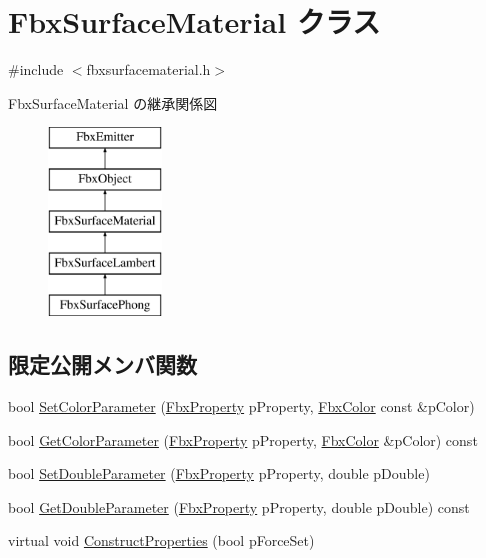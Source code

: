 \hypertarget{class_fbx_surface_material}{}\section{Fbx\+Surface\+Material クラス}
\label{class_fbx_surface_material}


{\ttfamily \#include $<$fbxsurfacematerial.\+h$>$}

Fbx\+Surface\+Material の継承関係図\begin{figure}[H]
\begin{center}
\leavevmode
\includegraphics[height=5.000000cm]{class_fbx_surface_material}
\end{center}
\end{figure}
\subsection*{限定公開メンバ関数}
\begin{DoxyCompactItemize}
\item 
bool \hyperlink{class_fbx_surface_material_aecd7c87e5db1902bf2b03834b92d5635}{Set\+Color\+Parameter} (\hyperlink{class_fbx_property}{Fbx\+Property} p\+Property, \hyperlink{class_fbx_color}{Fbx\+Color} const \&p\+Color)
\item 
bool \hyperlink{class_fbx_surface_material_a9c9823b3b0c6d2b6c216c4ca0a12a64d}{Get\+Color\+Parameter} (\hyperlink{class_fbx_property}{Fbx\+Property} p\+Property, \hyperlink{class_fbx_color}{Fbx\+Color} \&p\+Color) const
\item 
bool \hyperlink{class_fbx_surface_material_a5d2b4164f67106f295a456f68b6d3bf2}{Set\+Double\+Parameter} (\hyperlink{class_fbx_property}{Fbx\+Property} p\+Property, double p\+Double)
\item 
bool \hyperlink{class_fbx_surface_material_aa5a97e4e159289d05404b2ad28ed3e31}{Get\+Double\+Parameter} (\hyperlink{class_fbx_property}{Fbx\+Property} p\+Property, double p\+Double) const
\item 
virtual void \hyperlink{class_fbx_surface_material_aafc5d21293bea6b63a6ea96fa9fe0bb2}{Construct\+Properties} (bool p\+Force\+Set)
\end{DoxyCompactItemize}
